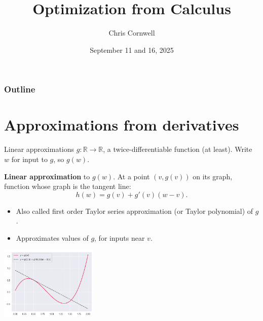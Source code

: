 \documentclass{beamer}
\author{Chris Cornwell}
\date{September 11 and 16, 2025}
\title{Optimization from Calculus}
\theoremstyle{example}
\newcommand{\bb}[1]{\mathbb{#1}}
\begin{document}
\begin{frame}
\titlepage
\end{frame}

\begin{frame}
\frametitle{Outline}
\tableofcontents
\end{frame}

\section{Approximations from derivatives}

\begin{frame}{Linear approximations}
    $g:\bb R\to\bb R$, a twice-differentiable function (at least).  Write $w$ for input to $g$, so $g(w)$.

    \textbf{Linear approximation} to $g(w)$. At a point $(v, g(v))$ on its graph, function whose graph is the tangent line:
        \[h(w) = g(v) + g'(v)(w - v).\]
    \vspace*{-12pt}
    \begin{multicols}{2}
        \begin{itemize}
            \item Also called first order Taylor series approximation (or Taylor polynomial) of $g$. 
            \item Approximates values of $g$, for inputs near $v$.
        \end{itemize}

        \includegraphics[width=0.35\textwidth]{../../Images/graph-and-linearapproximation.png}
    \end{multicols}

\end{frame}
\end{document}
